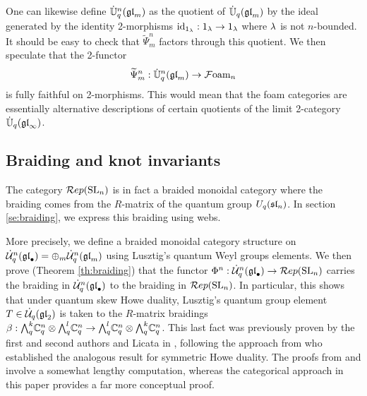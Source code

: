 \documentclass[11pt]{amsart}
\begin{document}
One can likewise define $\dot{\mathbb{U}}_q^n(\gl_m)$ as the quotient of $\dot{\mathbb{U}}_q(\gl_m)$ by the ideal generated by the identity 2-morphisms ${\rm id}_{1_\l}: 1_\l \rightarrow 1_\l$ where $\l$ is not $n$-bounded. It should be easy to check that $\widetilde{\Psi}_m^n$ factors through this quotient. We then speculate that the 2-functor
$$\widetilde{\Psi}_m^n: \dot{\mathbb{U}}_q^n(\gl_m) \rightarrow \Foam_n$$
is fully faithful on 2-morphisms. This would mean that the foam categories are essentially alternative descriptions of certain quotients of the limit 2-category $\dot{\mathbb{U}}_q(\gl_\infty)$.



\subsection{Braiding and knot invariants}
The category $\Rep(\SL_n)$ is in fact a braided monoidal category where the braiding comes from the $R$-matrix of the quantum group $ U_q(\sl_n)$.  In section \ref{se:braiding}, we express this braiding using webs.

More precisely, we define a braided monoidal category structure on $ \dU^n(\gl_\bullet) = \oplus_m \dU^n(\gl_m) $ using Lusztig's quantum Weyl groups elements.  We then prove (Theorem \ref{th:braiding}) that the functor $ \Phi^n : \dU^n(\gl_\bullet) \rightarrow \Rep(\SL_n) $ carries the braiding in $ \dU^n(\gl_\bullet) $ to the braiding in $ \Rep(\SL_n) $.  In particular, this shows that under quantum skew Howe duality, Lusztig's quantum group element $ T \in \dU(\gl_2) $ is taken to the $R$-matrix braidings $ \beta : \Alt{k}{q} \bC^n_q \otimes \Alt{l}{q} \bC^n_q \rightarrow \Alt{l}{q} \bC^n_q \otimes \Alt{k}{q} \bC^n_q$.  This last fact was previously proven by the first and second authors and Licata in \cite{MR2593278}, following the approach from \cite{MR1896470} who established the analogous result for symmetric Howe duality.  The proofs from \cite{MR1896470} and \cite{MR2593278} involve a somewhat lengthy computation, whereas the categorical approach in this paper provides a far more conceptual proof.
\end{document}
